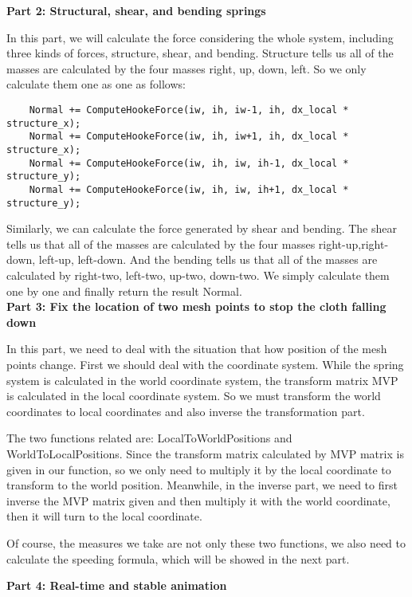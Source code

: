 \documentclass[acmtog]{acmart}
\begin{document}
\textbf{Part 2: Structural, shear, and bending springs}

In this part, we will calculate the force considering the whole system, including three kinds of forces, structure, shear, and bending. Structure tells us all of the masses are calculated by the four masses right, up, down, left. So we only calculate them one as one as follows: \\
\begin{lstlisting}
    Normal += ComputeHookeForce(iw, ih, iw-1, ih, dx_local * structure_x);
    Normal += ComputeHookeForce(iw, ih, iw+1, ih, dx_local * structure_x);
    Normal += ComputeHookeForce(iw, ih, iw, ih-1, dx_local * structure_y);
    Normal += ComputeHookeForce(iw, ih, iw, ih+1, dx_local * structure_y);
\end{lstlisting}

Similarly, we can calculate the force generated by shear and bending. The shear tells us that all of the masses are calculated by the four masses right-up,right-down, left-up, left-down. And the bending tells us that all of the masses are calculated by right-two, left-two, up-two, down-two. We simply calculate them one by one and finally return the result Normal. \\

\textbf{Part 3: Fix the location of two mesh points to stop the cloth falling down}

In this part, we need to deal with the situation that how position of the mesh points change. First we should deal with the coordinate system. While the spring system is calculated in the world coordinate system, the transform matrix MVP is calculated in the local coordinate system. So we must transform the world coordinates to local coordinates and also inverse the transformation part. 

The two functions related are: LocalToWorldPositions and WorldToLocalPositions. Since the transform matrix calculated by MVP matrix is given in our function, so we only need to multiply it by the local coordinate to transform to the world position. Meanwhile, in the inverse part, we need to first inverse the MVP matrix given and then multiply it with the world coordinate, then it will turn to the local coordinate. 

Of course, the measures we take are not only these two functions, we also need to calculate the speeding formula, which will be showed in the next part.

\textbf{Part 4: Real-time and stable animation}
\end{document}
